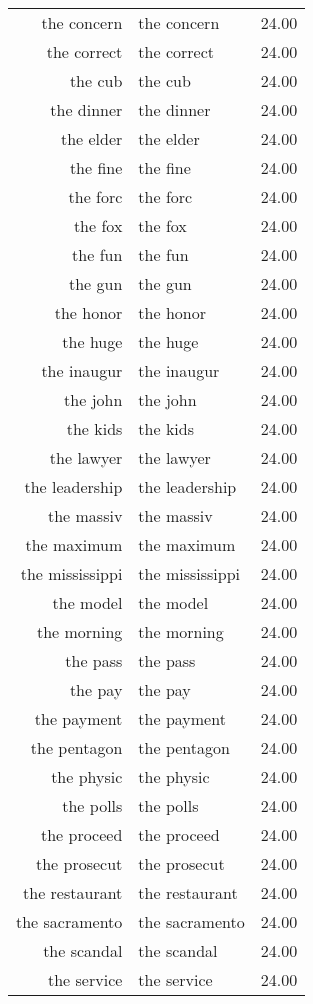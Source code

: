 \begin{table}[ht]
\begin{tabular}{rlr}
  the concern & the concern & 24.00 \\ 
  the correct & the correct & 24.00 \\ 
  the cub & the cub & 24.00 \\ 
  the dinner & the dinner & 24.00 \\ 
  the elder & the elder & 24.00 \\ 
  the fine & the fine & 24.00 \\ 
  the forc & the forc & 24.00 \\ 
  the fox & the fox & 24.00 \\ 
  the fun & the fun & 24.00 \\ 
  the gun & the gun & 24.00 \\ 
  the honor & the honor & 24.00 \\ 
  the huge & the huge & 24.00 \\ 
  the inaugur & the inaugur & 24.00 \\ 
  the john & the john & 24.00 \\ 
  the kids & the kids & 24.00 \\ 
  the lawyer & the lawyer & 24.00 \\ 
  the leadership & the leadership & 24.00 \\ 
  the massiv & the massiv & 24.00 \\ 
  the maximum & the maximum & 24.00 \\ 
  the mississippi & the mississippi & 24.00 \\ 
  the model & the model & 24.00 \\ 
  the morning & the morning & 24.00 \\ 
  the pass & the pass & 24.00 \\ 
  the pay & the pay & 24.00 \\ 
  the payment & the payment & 24.00 \\ 
  the pentagon & the pentagon & 24.00 \\ 
  the physic & the physic & 24.00 \\ 
  the polls & the polls & 24.00 \\ 
  the proceed & the proceed & 24.00 \\ 
  the prosecut & the prosecut & 24.00 \\ 
  the restaurant & the restaurant & 24.00 \\ 
  the sacramento & the sacramento & 24.00 \\ 
  the scandal & the scandal & 24.00 \\ 
  the service & the service & 24.00 \\ 

\end{tabular}
\end{table}
